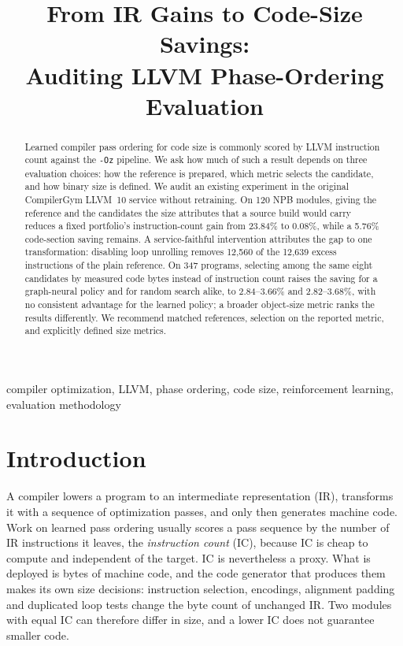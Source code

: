 \documentclass[conference,a4paper]{IEEEtran}
\begin{document}
\title{From IR Gains to Code-Size Savings:\\
Auditing LLVM Phase-Ordering Evaluation}

\author{
}

\maketitle

\begin{abstract}
Learned compiler pass ordering for code size is commonly scored by LLVM
instruction count against the \texttt{-Oz} pipeline. We ask how much of
such a result depends on three evaluation choices: how the reference is
prepared, which metric selects the candidate, and how binary size is
defined. We audit an existing experiment in the original CompilerGym
LLVM~10 service without retraining. On 120 NPB modules, giving the
reference and the candidates the size attributes that a source build
would carry reduces a fixed portfolio's instruction-count gain from
23.84\% to 0.08\%, while a 5.76\% code-section saving remains. A
service-faithful intervention attributes the gap to one transformation:
disabling loop unrolling removes 12,560 of the 12,639 excess
instructions of the plain reference. On 347 programs, selecting among
the same eight candidates by measured code bytes instead of instruction
count raises the saving for a graph-neural policy and for random search
alike, to 2.84--3.66\% and 2.82--3.68\%, with no consistent advantage
for the learned policy; a broader object-size metric ranks the results
differently. We recommend matched references, selection on the reported
metric, and explicitly defined size metrics.
\end{abstract}

\begin{IEEEkeywords}
compiler optimization, LLVM, phase ordering, code size, reinforcement
learning, evaluation methodology
\end{IEEEkeywords}

\section{Introduction}
A compiler lowers a program to an intermediate representation (IR),
transforms it with a sequence of optimization passes, and only then
generates machine code. Work on learned pass ordering usually scores a
pass sequence by the number of IR instructions it leaves, the
\emph{instruction count} (IC), because IC is cheap to compute and
independent of the target. IC is nevertheless a proxy. What is
deployed is bytes of machine code, and the code generator that produces
them makes its own size decisions: instruction selection, encodings,
alignment padding and duplicated loop tests change the byte count of
unchanged IR. Two modules with equal IC can therefore differ in size,
and a lower IC does not guarantee smaller code.
\end{document}
